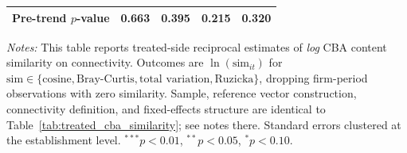 \begin{table}[H]
\begin{tabular}{lcccc}
Pre-trend $p$-value & 0.663 & 0.395 & 0.215 & 0.320 \\
\bottomrule
\end{tabular}
\begin{minipage}{\linewidth}
\footnotesize\vspace{4pt}
\textit{Notes:} This table reports treated-side reciprocal estimates of \emph{log} CBA content similarity on connectivity. Outcomes are $\ln(\text{sim}_{it})$ for $\text{sim} \in \{\text{cosine}, \text{Bray-Curtis}, \text{total variation}, \text{Ruzicka}\}$, dropping firm-period observations with zero similarity. Sample, reference vector construction, connectivity definition, and fixed-effects structure are identical to Table~\ref{tab:treated_cba_similarity}; see notes there. Standard errors clustered at the establishment level. $^{***}p<0.01$, $^{**}p<0.05$, $^{*}p<0.10$.
\end{minipage}
\end{table}
